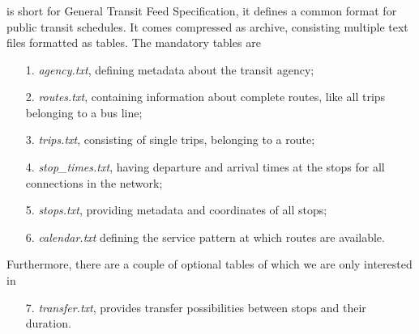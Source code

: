 \subsubsection{\gtfs}
	\gtfs {} is short for General Transit Feed Specification, it defines a common format
	for public transit schedules. It comes compressed as \zip archive, consisting multiple
	text files formatted as \csv tables. The mandatory tables are
	\begin{itemize}
		\item[1.] \textit{agency.txt}, defining metadata about the transit agency;
		\item[2.] \textit{routes.txt}, containing information about complete routes, like all trips belonging to a bus line;
		\item[3.] \textit{trips.txt}, consisting of single trips, belonging to a route;
		\item[4.] \textit{stop\_times.txt}, having departure and arrival times at the stops for all connections in the network;
		\item[5.] \textit{stops.txt}, providing metadata and coordinates of all stops;
		\item[6.] \textit{calendar.txt} defining the service pattern at which routes are available.
	\end{itemize}
	Furthermore, there are a couple of optional tables of which we are only interested in
	\begin{itemize}
		\item[7.] \textit{transfer.txt}, provides transfer possibilities between stops and their duration.
	\end{itemize}
